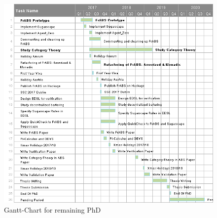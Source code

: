 \label{app:gantt}
\begin{landscape}
	\begin{figure}
		\label{fig:gantt}
  		\caption{Gantt-Chart for remaining PhD}
  		\centering
  		\includegraphics[width=1.2\textwidth]{./charts/gantt.png}
	\end{figure}
\end{landscape}